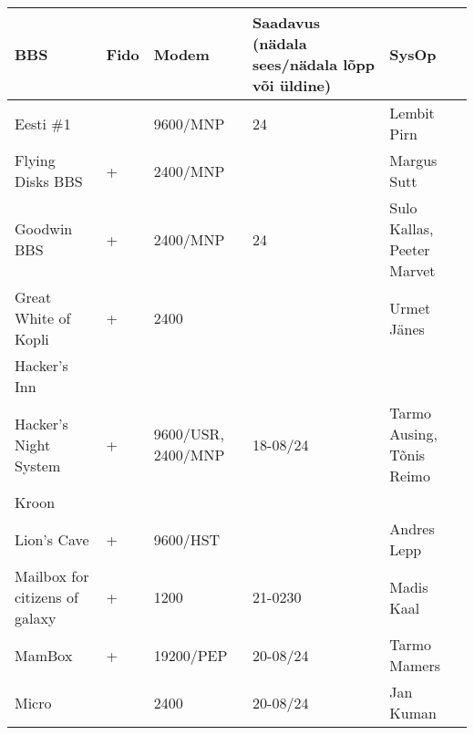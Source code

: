 \begin{table}[ht]
\centering
\begin{tabular}{llp{2cm}p{3cm}p{4cm}}
BBS                            & Fido & Modem              & Saadavus (nädala sees/nädala lõpp või üldine) & SysOp                       \\
\midrule
Eesti \#1                      &      & 9600/MNP           & 24                                            & Lembit Pirn\index[ppl]{Pirn, Lembit}                 \\
Flying Disks BBS               & +    & 2400/MNP           &                                               & Margus Sutt\index[ppl]{Sutt, Margus}                 \\
Goodwin BBS                    & +    & 2400/MNP           & 24                                            & Sulo Kallas\index[ppl]{Kallas, Sulo}\index[ppl]{Marvet, Peeter}, Peeter Marvet  \\
Great White of Kopli           & +    & 2400               &                                               & Urmet Jänes\index[ppl]{Jänes, Urmet}                 \\
Hacker's Inn                   &      &                    &                                               &                             \\
Hacker's Night System          & +    & 9600/USR, 2400/MNP & 18-08/24                                      & Tarmo Ausing\index[ppl]{Ausing, Tarmo}, Tõnis Reimo\index[ppl]{Reimo, Tõnis}   \\
Kroon                          &      &                    &                                               &                             \\
Lion's Cave                    & +    & 9600/HST           &                                               & Andres Lepp\index[ppl]{Lepp, Andres}                 \\
Mailbox for citizens of galaxy & +    & 1200               & 21-0230                                       & Madis Kaal\index[ppl]{Kaal, Madis}                  \\
MamBox                         & +    & 19200/PEP          & 20-08/24                                      & Tarmo Mamers\index[ppl]{Mamers, Tarmo}                \\
Micro                          &      & 2400               & 20-08/24                                      & Jan Kuman\index[ppl]{Kuman, Jan}                   \\

\end{tabular}
\end{table}
